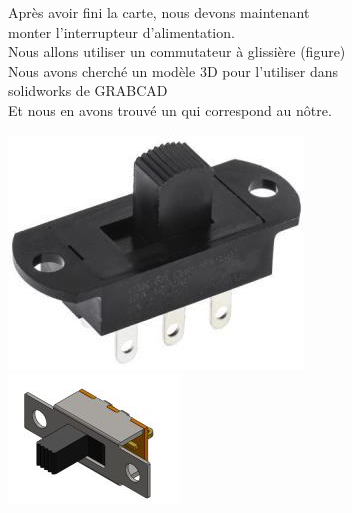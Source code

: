 \begin{figure}[!htbp]
    \centering
    \begin{subfigure}[m]{.6\linewidth}
        Après avoir fini la carte, nous devons maintenant monter l’interrupteur d’alimentation. \\
        Nous allons utiliser un commutateur à glissière (figure) \\
        Nous avons cherché un modèle 3D pour l’utiliser dans solidworks de GRABCAD \\
        Et nous en avons trouvé un qui correspond au nôtre. \\
    \end{subfigure}
    \hfill
    \begin{subfigure}{.3\linewidth}
        \centering
        \includegraphics[width=\linewidth]{assets/conception1/img221.jpg}
        \includegraphics[width=\linewidth]{assets/conception1/img222.jpg}
    \end{subfigure}
\end{figure}

